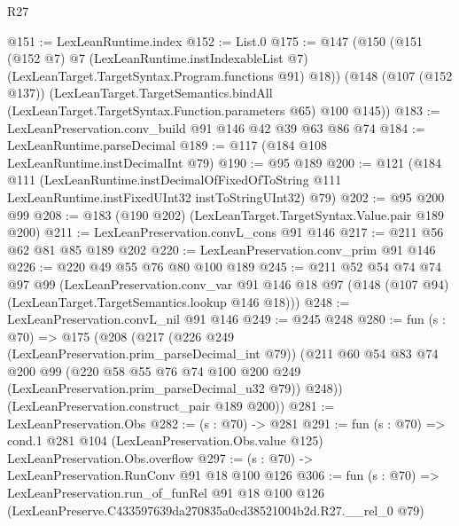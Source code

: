 \begin{lexlean}{R27}
\begin{coremodule}
@151 := LexLeanRuntime.index
@152 := List.{0}
@175 := @147
    (@150
      (@151
        (@152 @7)
        @7
        (LexLeanRuntime.instIndexableList @7)
        (LexLeanTarget.TargetSyntax.Program.functions @91)
        @18))
    (@148
      (@107 (@152 @137))
      (LexLeanTarget.TargetSemantics.bindAll
        (LexLeanTarget.TargetSyntax.Function.parameters @65)
        @100
        @145))
@183 := LexLeanPreservation.conv_build @91 @146 @42 @39 @63 @86 @74
@184 := LexLeanRuntime.parseDecimal
@189 := @117 (@184 @108 LexLeanRuntime.instDecimalInt @79)
@190 := @95 @189
@200 := @121
    (@184
      @111
      (LexLeanRuntime.instDecimalOfFixedOfToString
        @111
        LexLeanRuntime.instFixedUInt32
        instToStringUInt32)
      @79)
@202 := @95 @200 @99
@208 := @183 (@190 @202) (LexLeanTarget.TargetSyntax.Value.pair @189 @200)
@211 := LexLeanPreservation.convL_cons @91 @146
@217 := @211 @56 @62 @81 @85 @189 @202
@220 := LexLeanPreservation.conv_prim @91 @146
@226 := @220 @49 @55 @76 @80 @100 @189
@245 := @211
    @52
    @54
    @74
    @74
    @97
    @99
    (LexLeanPreservation.conv_var
      @91
      @146
      @18
      @97
      (@148 (@107 @94) (LexLeanTarget.TargetSemantics.lookup @146 @18)))
@248 := LexLeanPreservation.convL_nil @91 @146
@249 := @245 @248
@280 := fun (s : @70) =>
  @175
    (@208
      (@217
        (@226 @249 (LexLeanPreservation.prim_parseDecimal_int @79))
        (@211
          @60
          @54
          @83
          @74
          @200
          @99
          (@220 @58 @55 @76 @74 @100 @200 @249 (LexLeanPreservation.prim_parseDecimal_u32 @79))
          @248))
      (LexLeanPreservation.construct_pair @189 @200))
@281 := LexLeanPreservation.Obs
@282 := (s : @70) -> @281
@291 := fun (s : @70) =>
  cond.{1} @281 @104 (LexLeanPreservation.Obs.value @125) LexLeanPreservation.Obs.overflow
@297 := (s : @70) -> LexLeanPreservation.RunConv @91 @18 @100 @126
@306 := fun (s : @70) =>
  LexLeanPreservation.run_of_funRel
    @91
    @18
    @100
    @126
    (LexLeanPreserve.C433597639da270835a0cd38521004b2d.R27.__rel_0 @79)
\end{coremodule}
\end{lexlean}
